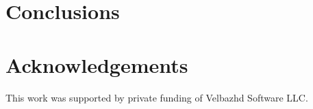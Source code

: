 \documentclass{llncs}
\begin{document}
\cite{zankinski01} \cite{balabanov01} \cite{balabanov02} \cite{balabanov03} \cite{keremedchiev01} \cite{atanasova01}

\section{Conclusions}


\section*{Acknowledgements}

This work was supported by private funding of Velbazhd Software LLC.

\end{document}
